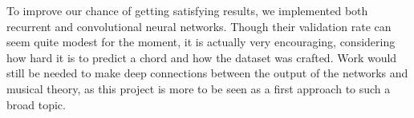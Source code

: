 \documentclass{article}
\begin{document}
To improve our chance of getting satisfying results, we implemented both recurrent and convolutional neural networks. Though their validation rate can seem quite modest for the moment, it is actually very encouraging, considering how hard it is to predict a chord and how the dataset was crafted. Work would still be needed to make deep connections between the output of the networks and musical theory, as this project is more to be seen as a first approach to such a broad topic.



\end{document}
